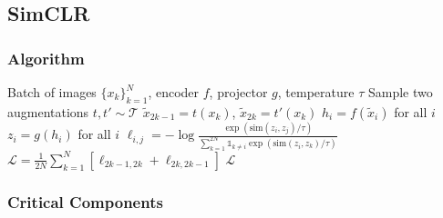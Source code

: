 \subsection{SimCLR}

\subsubsection{Algorithm}

\begin{algorithm}[H]
\caption{SimCLR: A Simple Framework for Contrastive Learning}
\begin{algorithmic}[1]
\REQUIRE Batch of images $\{x_k\}_{k=1}^N$, encoder $f$, projector $g$, temperature $\tau$
    \STATE Sample two augmentations $t, t' \sim \mathcal{T}$
    \STATE $\tilde{x}_{2k-1} = t(x_k)$, $\tilde{x}_{2k} = t'(x_k)$
\ENDFOR
\STATE $h_i = f(\tilde{x}_i)$ for all $i$ 
\STATE $z_i = g(h_i)$ for all $i$ 
    \STATE $\ell_{i,j} = -\log \frac{\exp(\text{sim}(z_i, z_j)/\tau)}{\sum_{k=1}^{2N} \mathds{1}_{k \neq i} \exp(\text{sim}(z_i, z_k)/\tau)}$
\ENDFOR
\STATE $\mathcal{L} = \frac{1}{2N} \sum_{k=1}^{N} [\ell_{2k-1, 2k} + \ell_{2k, 2k-1}]$
\RETURN $\mathcal{L}$
\end{algorithmic}
\end{algorithm}

\subsubsection{Critical Components}

